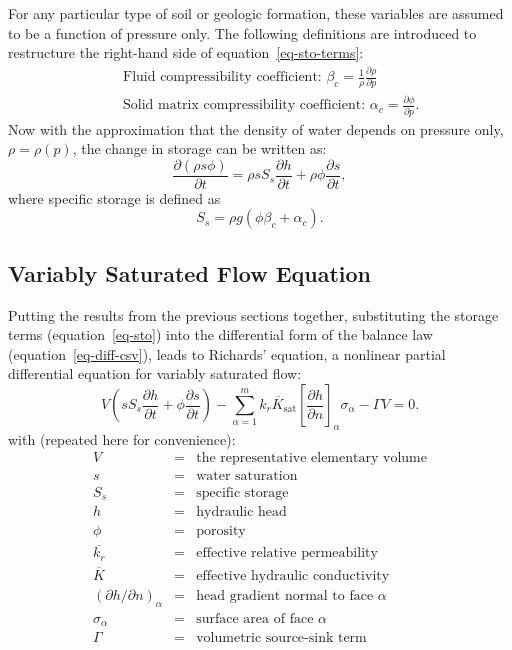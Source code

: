 \documentclass[fleqn]{article}
\begin{document}
For any particular type of soil or geologic formation, these variables
are assumed to be a function of pressure only. The following definitions
are introduced to restructure the right-hand side of
equation~\ref{eq-sto-terms}:
\begin{eqnarray*}
  &&\text{Fluid compressibility coefficient: }
    \beta_c = \frac{1}{\rho} \frac{\partial \rho}{\partial p} \\
  &&\text{Solid matrix compressibility coefficient: }
    \alpha_c = \frac{\partial \phi}{\partial p}.
\end{eqnarray*}
Now with the approximation that the density of water depends on
pressure only, $\rho = \rho(p)$, the change in storage can be written
as:
\begin{equation}
  \frac{\partial (\rho s \phi)}{\partial t} =
  \rho s S_s \frac{\partial h}{\partial t} +
  \rho \phi \frac{\partial s}{\partial t},
  \label{eq-sto}
\end{equation}
where specific storage is defined as
\begin{equation}
  S_s = \rho g \left( \phi \beta_c + \alpha_c \right).
\end{equation}

\subsection{Variably Saturated Flow Equation}
Putting the results from the previous sections together,
substituting the storage terms (equation~\ref{eq-sto}) into the 
differential form of the balance law (equation~\ref{eq-diff-csv}), 
leads to Richards' equation, a nonlinear partial differential equation for 
variably saturated flow:
\begin{equation}  
  V
  \left(
    s S_s \frac{\partial h}{\partial t} + 
    \phi \frac{\partial s}{\partial t}
  \right) -
  \sum_{\alpha=1}^{m} \overline{k_r K_{\textrm{sat}}}
  \left[\frac{\partial h}{\partial n}\right]_\alpha \sigma_\alpha -
  \Gamma V = 0.
  \label{eq-unsat-flow}
\end{equation}
with (repeated here for convenience):
\begin{eqnarray*}
  V &=& \text{the representative elementary volume} \\
  s &=& \text{water saturation} \\
  S_s &=& \text{specific storage} \\
  h &=& \text{hydraulic head} \\
  \phi &=& \text{porosity} \\
  \overline{k_r} &=& \text{effective relative permeability} \\
  \overline{K} &=& \text{effective hydraulic conductivity} \\
  (\partial h/\partial n)_\alpha &=& \text{head gradient normal to face $\alpha$} \\
  \sigma_\alpha &=& \text{surface area of face $\alpha$} \\
  \Gamma &=& \text{volumetric source-sink term}
\end{eqnarray*}
\end{document}

